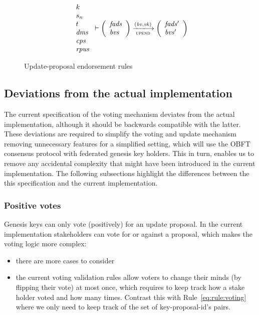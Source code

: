 \begin{figure}[htb]
\begin{equation}
{{\begin{array}{l}
          k\\
          s_n\\
          t\\
          \var{dms}\\
          \var{cps}\\
          \var{rpus}
        \end{array}
      }
      \vdash
      {
        \left(
          \begin{array}{l}
            \var{fads}\\
            \var{bvs}
          \end{array}
        \right)
      }
      \trans{upend}{(\var{bv}, \var{vk})}
      {
        \left(
          \begin{array}{l}
            \var{fads'}\\
            \var{bvs'}
          \end{array}
        \right)
      }
    }
  \end{equation}
  \caption{Update-proposal endorsement rules}
  \label{fig:rules:up-end}
\end{figure}

\clearpage

\subsection{Deviations from the actual implementation}
\label{sec:deviation-actual-impl}

The current specification of the voting mechanism deviates from the actual
implementation, although it should be backwards compatible with the latter.
These deviations are required to simplify the voting and update mechanism
removing unnecessary features for a simplified setting, which will use the OBFT
consensus protocol with federated genesis key holders. This in turn, enables us
to remove any accidental complexity that might have been introduced in the
current implementation. The following subsections highlight the differences
between the this specification and the current implementation.

\subsubsection{Positive votes}
\label{sec:only-positive-votes}

Genesis keys can only vote (positively) for an update proposal. In the current
implementation stakeholders can vote for or against a proposal, which makes the
voting logic more complex:
\begin{itemize}
\item there are more cases to consider
\item the current voting validation rules allow voters to change their minds
  (by flipping their vote) at most once, which requires to keep track how a
  stake holder voted and how many times. Contrast this with
  Rule~\ref{eq:rule:voting} where we only need to keep track of the set of
  key-proposal-id's pairs.
\end{itemize}

